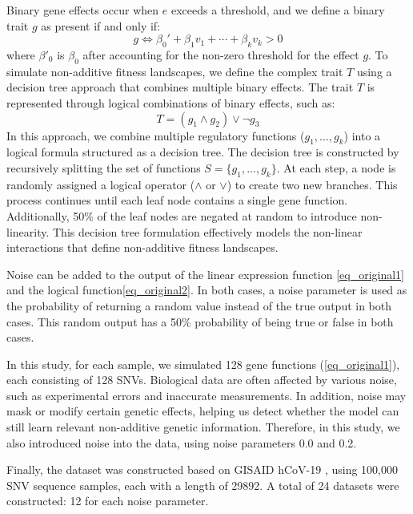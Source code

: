 \documentclass{article}
\begin{document}
Binary gene effects occur when \( e \) exceeds a threshold, and we define a binary trait \( g \) as present if and only if:
\begin{equation}
g \iff \beta_0' + \beta_1 v_1 + \cdots + \beta_k v_k > 0
\label{eq_original1}
\end{equation}
where $\beta'_0$ is $\beta_0$ after accounting for the non-zero threshold for the effect $g$.
To simulate non-additive fitness landscapes, we define the complex trait \( T \) using a decision tree approach that combines multiple binary effects. The trait \( T \) is represented through logical combinations of binary effects, such as:
\begin{equation}
T = (g_1 \land g_2) \lor \neg g_3
\label{eq_original2}
\end{equation}
In this approach, we combine multiple regulatory functions ($g_1, \dots, g_k$) into a logical formula structured as a decision tree. The decision tree is constructed by recursively splitting the set of functions $S = \{g_1, \dots, g_k\}$. At each step, a node is randomly assigned a logical operator ($\land$ or $\lor$) to create two new branches. This process continues until each leaf node contains a single gene function. Additionally, 50\% of the leaf nodes are negated at random to introduce non-linearity. This decision tree formulation effectively models the non-linear interactions that define non-additive fitness landscapes.

Noise can be added to the output of the linear expression function \eqref{eq_original1} and the logical function\eqref{eq_original2}. In both cases, a noise parameter is used as the probability of returning a random value instead of the true output in both cases. This random output has a 50\% probability of being true or false in both cases. 

In this study, for each sample, we simulated 128 gene functions (\eqref{eq_original1}), each consisting of 128 SNVs. Biological data are often affected by various noise, such as experimental errors and inaccurate measurements. In addition, noise may mask or modify certain genetic effects, helping us detect whether the model can still learn relevant non-additive genetic information. Therefore, in this study, we also introduced noise into the data, using noise parameters 0.0 and 0.2.

Finally, the dataset was constructed based on GISAID hCoV-19 \parencite{elbe2017data}, using 100,000 SNV sequence samples, each with a length of 29892. A total of 24 datasets were constructed: 12 for each noise parameter.
\end{document}
